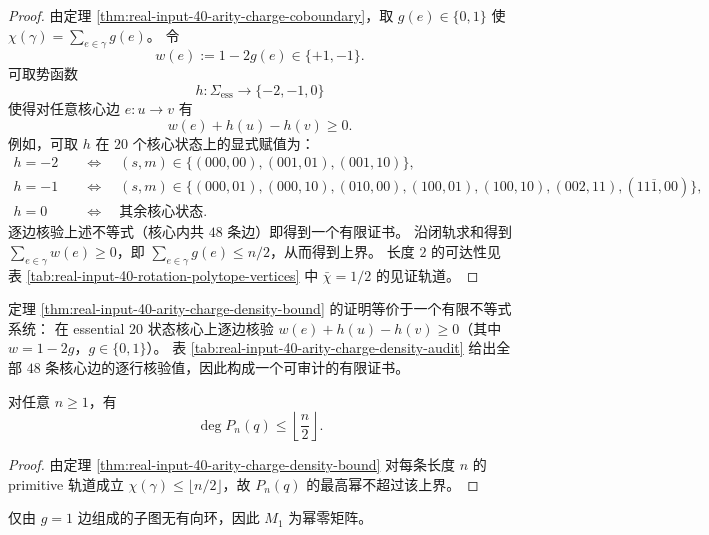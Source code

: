 \begin{proof}
由定理 \ref{thm:real-input-40-arity-charge-coboundary}，取 $g(e)\in\{0,1\}$ 使 $\chi(\gamma)=\sum_{e\in\gamma}g(e)$。
令
\[
w(e):=1-2g(e)\in\{+1,-1\}.
\]
可取势函数
\[
h:\Sigma_{\mathrm{ess}}\to\{-2,-1,0\}
\]
使得对任意核心边 $e:u\to v$ 有
\[
w(e)+h(u)-h(v)\ge 0.
\]
例如，可取 $h$ 在 $20$ 个核心状态上的显式赋值为：
\[
\begin{aligned}
h=-2&\quad\Longleftrightarrow\quad (s,m)\in\{(000,00),(001,01),(001,10)\},\\
h=-1&\quad\Longleftrightarrow\quad (s,m)\in\{(000,01),(000,10),(010,00),(100,01),(100,10),(002,11),(11\overline{1},00)\},\\
h=0&\quad\Longleftrightarrow\quad \text{其余核心状态}.
\end{aligned}
\]
逐边核验上述不等式（核心内共 $48$ 条边）即得到一个有限证书。
沿闭轨求和得到 $\sum_{e\in\gamma}w(e)\ge 0$，即 $\sum_{e\in\gamma}g(e)\le n/2$，从而得到上界。
长度 $2$ 的可达性见表 \ref{tab:real-input-40-rotation-polytope-vertices} 中 $\bar\chi=1/2$ 的见证轨道。
\end{proof}

\begin{remark}\label{rem:real-input-40-arity-charge-density-audit}
定理 \ref{thm:real-input-40-arity-charge-density-bound} 的证明等价于一个有限不等式系统：
在 essential $20$ 状态核心上逐边核验 $w(e)+h(u)-h(v)\ge 0$（其中 $w=1-2g$，$g\in\{0,1\}$）。
表 \ref{tab:real-input-40-arity-charge-density-audit} 给出全部 $48$ 条核心边的逐行核验值，因此构成一个可审计的有限证书。
\end{remark}


\begin{corollary}\label{cor:real-input-40-arity-charge-degree-bound}
对任意 $n\ge 1$，有
\[
\deg P_n(q)\le \left\lfloor \frac{n}{2}\right\rfloor.
\]
\end{corollary}

\begin{proof}
由定理 \ref{thm:real-input-40-arity-charge-density-bound} 对每条长度 $n$ 的 primitive 轨道成立 $\chi(\gamma)\le \lfloor n/2\rfloor$，故 $P_n(q)$ 的最高幂不超过该上界。
\end{proof}

\begin{corollary}[$g=1$ 子图无环与 $M_1$ 幂零]\label{cor:real-input-40-arity-charge-g1-acyclic}
仅由 $g=1$ 边组成的子图无有向环，因此 $M_1$ 为幂零矩阵。
\end{corollary}

